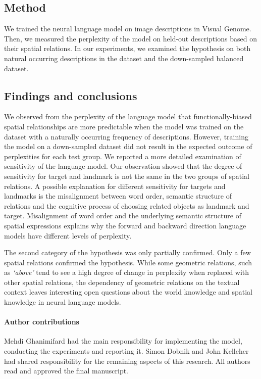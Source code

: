 \subsection{Method}
We trained the neural language model on image descriptions in Visual Genome. Then, we measured the perplexity of the model on held-out descriptions based on their spatial relations. In our experiments, we examined the hypothesis on both natural occurring descriptions in the dataset and the down-sampled balanced dataset.

\subsection{Findings and conclusions}
We observed from the perplexity of the language model that functionally-biased spatial relationships are more predictable when the model was trained on the dataset with a naturally occurring frequency of descriptions.
However, training the model on a down-sampled dataset did not result in the expected outcome of perplexities for each test group.%
We reported a more detailed examination of sensitivity %
of the language model.
Our observation showed that the degree of sensitivity for target and landmark is not the same in the two groups of spatial relations. 
A possible explanation for different sensitivity for targets and landmarks is the misalignment between word order, semantic structure of relations and the cognitive process of choosing related objects as landmark and target. 
Misalignment of word order and the underlying semantic structure of spatial expressions explains why the forward and backward direction language models have different levels of perplexity.

The second category of the hypothesis was only partially confirmed. 
Only a few spatial relations confirmed the hypothesis. 
While some geometric relations, such as \emph{`above'} tend to see a high degree of change in perplexity when replaced with other spatial relations, the dependency of geometric relations on the textual context leaves interesting open questions about the world knowledge and spatial knowledge in neural language models.

\paragraph{Author contributions}
Mehdi Ghanimifard had the main responsibility for implementing the model, conducting the experiments and reporting it. Simon Dobnik and John Kelleher had shared responsibility for the remaining aspects of this research. All authors read and approved the final manuscript.

